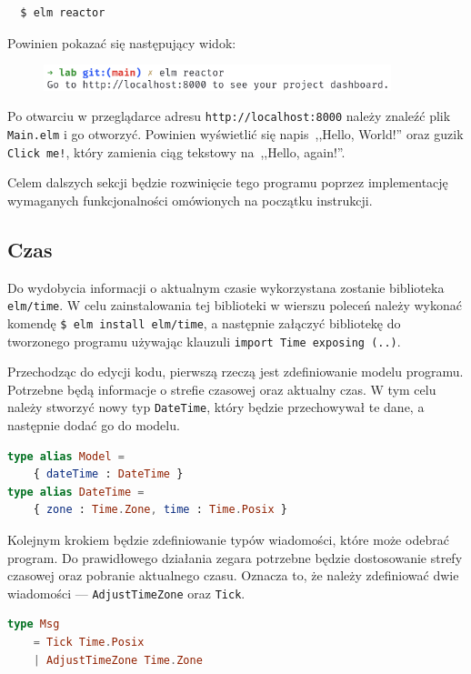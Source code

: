\documentclass[twoside,a4paper]{report}
\begin{document}
\begin{lstlisting}
  $ elm reactor
\end{lstlisting}

Powinien pokazać się następujący widok:

\begin{figure}[H]
    \centering
    \includegraphics[width=0.9\textwidth]{img/elm_reactor}
\end{figure}

Po otwarciu w przeglądarce adresu \texttt{http://localhost:8000} należy znaleźć plik \texttt{Main.elm} i go otworzyć.
Powinien wyświetlić się napis~,,Hello, World!'' oraz guzik \texttt{Click me!}, który zamienia ciąg tekstowy na~,,Hello, again!''.

Celem dalszych sekcji będzie rozwinięcie tego programu poprzez implementację wymaganych funkcjonalności omówionych na początku instrukcji.

\subsection*{Czas}
Do wydobycia informacji o aktualnym czasie wykorzystana zostanie biblioteka \texttt{elm/time}.
W celu zainstalowania tej biblioteki w wierszu poleceń należy wykonać komendę \texttt{\$ elm install elm/time}, a następnie załączyć bibliotekę do tworzonego programu używając klauzuli \texttt{import Time exposing (..)}.

Przechodząc do edycji kodu, pierwszą rzeczą jest zdefiniowanie modelu programu.
Potrzebne będą informacje o strefie czasowej oraz aktualny czas.
W tym celu należy stworzyć nowy typ \texttt{DateTime}, który będzie przechowywał te dane, a następnie dodać go do modelu.

\begin{lstlisting}[language=Elm]
type alias Model =
    { dateTime : DateTime }
type alias DateTime =
    { zone : Time.Zone, time : Time.Posix }
\end{lstlisting}

Kolejnym krokiem będzie zdefiniowanie typów wiadomości, które może odebrać program.
Do prawidłowego działania zegara potrzebne będzie dostosowanie strefy czasowej oraz pobranie aktualnego czasu.
Oznacza to, że należy zdefiniować dwie wiadomości --- \texttt{AdjustTimeZone} oraz \texttt{Tick}.

\begin{lstlisting}[language=Elm]
type Msg
    = Tick Time.Posix
    | AdjustTimeZone Time.Zone
\end{lstlisting}
\end{document}
